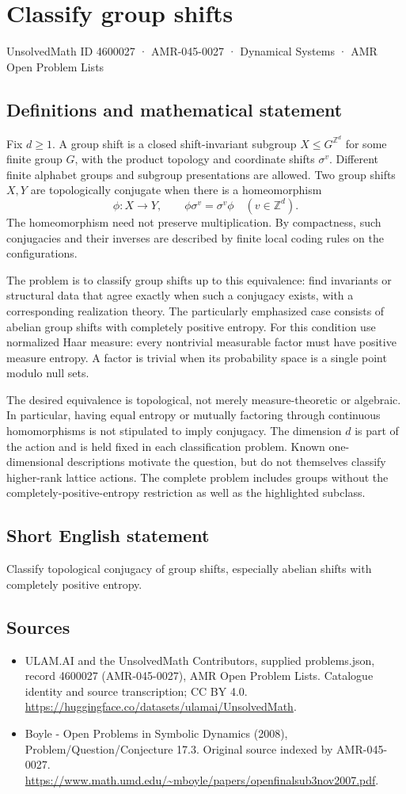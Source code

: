 \documentclass[11pt,a4paper]{article}
\begin{document}
\section*{Classify group shifts}\label{4600027}
{\small UnsolvedMath ID 4600027 · AMR-045-0027 · Dynamical Systems · AMR Open Problem Lists}
\subsection{Definitions and mathematical statement}
Fix $d\ge1$. A group shift is a closed shift-invariant subgroup
$X\le G^{\mathbb Z^d}$ for some finite group $G$, with the product
topology and coordinate shifts $\sigma^v$. Different finite alphabet
groups and subgroup presentations are allowed. Two group shifts $X,Y$
are topologically conjugate when there is a homeomorphism
\[
 \phi:X\to Y,\qquad \phi\sigma^v=\sigma^v\phi
       \quad(v\in\mathbb Z^d).
\]
The homeomorphism need not preserve multiplication. By compactness,
such conjugacies and their inverses are described by finite local
coding rules on the configurations.

The problem is to classify group shifts up to this equivalence: find
invariants or structural data that agree exactly when such a conjugacy
exists, with a corresponding realization theory. The particularly
emphasized case consists of abelian group shifts with completely positive
entropy. For this condition use normalized Haar measure: every
nontrivial measurable factor must have positive measure entropy.
A factor is trivial when its probability space is a single point modulo
null sets.

The desired equivalence is topological, not merely measure-theoretic or
algebraic. In particular, having equal entropy or mutually factoring
through continuous homomorphisms is not stipulated to imply conjugacy.
The dimension $d$ is part of the action and is held fixed in each
classification problem. Known one-dimensional descriptions motivate the
question, but do not themselves classify higher-rank lattice actions.
The complete problem includes groups without the completely-positive-entropy
restriction as well as the highlighted subclass.
\subsection{Short English statement}
Classify topological conjugacy of group shifts, especially abelian shifts with completely positive entropy.
\subsection{Sources}
\begin{itemize}
\item[S1] ULAM.AI and the UnsolvedMath Contributors, supplied problems.json, record 4600027 (AMR-045-0027), AMR Open Problem Lists. Catalogue identity and source transcription; CC BY 4.0.
\url{https://huggingface.co/datasets/ulamai/UnsolvedMath}.
\item[S2] Boyle - Open Problems in Symbolic Dynamics (2008), Problem/Question/Conjecture 17.3. Original source indexed by AMR-045-0027.
\url{https://www.math.umd.edu/~mboyle/papers/openfinalsub3nov2007.pdf}.
\end{itemize}
\end{document}
